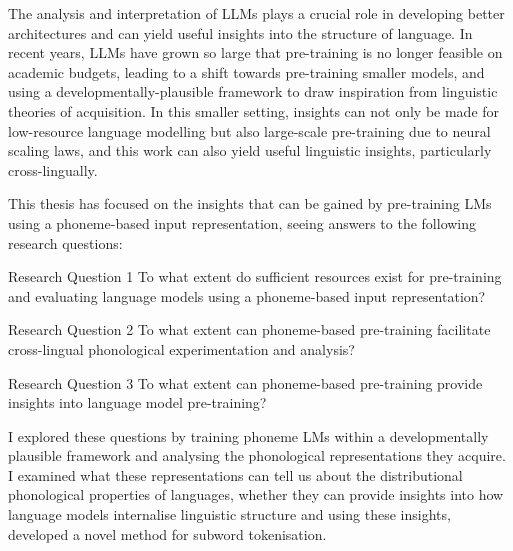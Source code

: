 The analysis and interpretation of LLMs plays a crucial role in developing better architectures and can yield useful insights into the structure of language. In recent years, LLMs have grown so large that pre-training is no longer feasible on academic budgets, leading to a shift towards pre-training smaller models, and using a developmentally-plausible framework to draw inspiration from linguistic theories of acquisition. In this smaller setting, insights can not only be made for low-resource language modelling but also large-scale pre-training due to neural scaling laws, and this work can also yield useful linguistic insights, particularly cross-lingually.

This thesis has focused on the insights that can be gained by pre-training LMs using a phoneme-based input representation, seeing answers to the following research questions:

\begin{question*}{Research Question 1}
    To what extent do sufficient resources exist for pre-training and evaluating language models using a phoneme-based input representation?
\end{question*}

\begin{question*}{Research Question 2}
    To what extent can phoneme-based pre-training facilitate cross-lingual phonological experimentation and analysis?
\end{question*}

\begin{question*}{Research Question 3}
    To what extent can phoneme-based pre-training provide insights into language model pre-training?
\end{question*}

I explored these questions by training phoneme LMs within a developmentally plausible framework and analysing the phonological representations they acquire. I examined what these representations can tell us about the distributional phonological properties of languages, whether they can provide insights into how language models internalise linguistic structure and using these insights, developed a novel method for subword tokenisation. %

